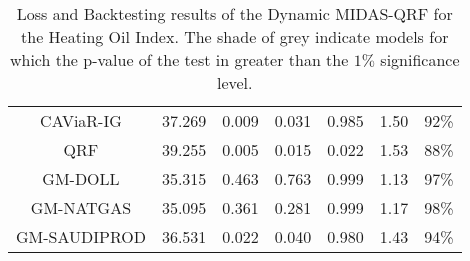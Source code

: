 \begin{table}[H]
\begin{tabular}{ccccccc}
CAViaR-IG                      & 37.269 & 0.009    & 0.031    & 0.985    & 1.50 & 92\%   \\

QRF                            & 39.255 & 0.005    & 0.015    & 0.022    & 1.53 & 88\%   \\
\rowcolor[HTML]{D9D9D9} 
GM-DOLL                        & 35.315 & 0.463    & 0.763    & 0.999    & 1.13 & 97\%   \\
\rowcolor[HTML]{D9D9D9} 
GM-NATGAS                      & 35.095 & 0.361    & 0.281    & 0.999    & 1.17 & 98\%   \\
\rowcolor[HTML]{D9D9D9} GM-SAUDIPROD                  & 36.531 & 0.022    & 0.040    & 0.980    & 1.43 & 94\%   \\ \hline
\end{tabular}
\caption{Loss and Backtesting results of the Dynamic MIDAS-QRF for the Heating Oil Index.  The shade of grey indicate models for which the p-value of the test in greater than the $1\%$ significance level.}
\label{tab:heat-dyn}
\end{table}